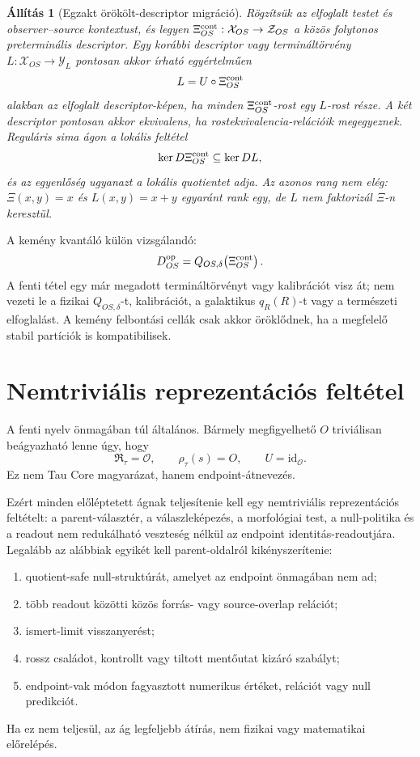 \documentclass[12pt]{article}
\newtheorem{proposition}{Állítás}
\newcommand{\RTspace}{\mathfrak R_{\tau}}
\newcommand{\Rmap}{\rho_{\tau}}
\newcommand{\Obs}{\mathcal O}
\begin{document}
\begin{proposition}[Egzakt örökölt-descriptor migráció]
\label{prop:mopr-migration-hu}
Rögzítsük az elfoglalt testet és observer--source kontextust, és legyen
\(\Xi_{OS}^{\rm cont}:\mathcal X_{OS}\to\mathcal Z_{OS}\) a közös folytonos
preterminális descriptor. Egy korábbi descriptor vagy termináltörvény
\(L:\mathcal X_{OS}\to\mathcal Y_L\) pontosan akkor írható egyértelműen
\begin{equation}
 L=U\circ\Xi_{OS}^{\rm cont}
 \label{eq:mopr-migration-hu}
\end{equation}
alakban az elfoglalt descriptor-képen, ha minden
\(\Xi_{OS}^{\rm cont}\)-rost egy \(L\)-rost része. A két descriptor pontosan
akkor ekvivalens, ha rostekvivalencia-relációik megegyeznek. Reguláris sima
ágon a lokális feltétel
\[
 \ker D\Xi_{OS}^{\rm cont}\subseteq\ker DL,
\]
és az egyenlőség ugyanazt a lokális quotientet adja. Az azonos rang nem elég:
\(\Xi(x,y)=x\) és \(L(x,y)=x+y\) egyaránt rank egy, de \(L\) nem faktorizál
\(\Xi\)-n keresztül.
\end{proposition}

A kemény kvantáló külön vizsgálandó:
\begin{equation}
 D_{OS}^{\rm op}=Q_{OS,\delta}\!\left(\Xi_{OS}^{\rm cont}\right).
 \label{eq:operational-record-hu}
\end{equation}
A fenti tétel egy már megadott termináltörvényt vagy kalibrációt visz át;
nem vezeti le a fizikai \(Q_{OS,\delta}\)-t, kalibrációt, a galaktikus
\(q_R(R)\)-t vagy a természeti elfoglalást. A kemény felbontási cellák csak
akkor öröklődnek, ha a megfelelő stabil partíciók is kompatibilisek.

\section{Nemtriviális reprezentációs feltétel}

A fenti nyelv önmagában túl általános.  Bármely megfigyelhető \(O\) triviálisan
beágyazható lenne úgy, hogy
\[
  \RTspace=\Obs,\qquad \Rmap(s)=O,\qquad U=\mathrm{id}_{\Obs}.
\]
Ez nem Tau Core magyarázat, hanem endpoint-átnevezés.

Ezért minden előléptetett ágnak teljesítenie kell egy nemtriviális
reprezentációs feltételt: a parent-választér, a válaszleképezés, a
morfológiai test, a null-politika és a readout nem redukálható veszteség nélkül
az endpoint identitás-readoutjára.  Legalább az alábbiak egyikét kell
parent-oldalról kikényszerítenie:
\begin{enumerate}[label=(N\arabic*)]
  \item quotient-safe null-struktúrát, amelyet az endpoint önmagában nem ad;
  \item több readout közötti közös forrás- vagy source-overlap relációt;
  \item ismert-limit visszanyerést;
  \item rossz családot, kontrollt vagy tiltott mentőutat kizáró szabályt;
  \item endpoint-vak módon fagyasztott numerikus értéket, relációt vagy null
  predikciót.
\end{enumerate}
Ha ez nem teljesül, az ág legfeljebb átírás, nem fizikai vagy matematikai
előrelépés.
\end{document}
